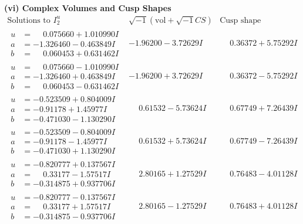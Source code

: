 \documentclass[1p]{elsarticle_modified}
\theoremstyle{definition}
\newcommand{\I}{\sqrt{-1}}
\begin{document}
\newpage\flushleft \textbf{(vi) Complex Volumes and Cusp Shapes}
$$\begin{array}{c|c|c}  
\text{Solutions to }I^u_{2}& \I (\text{vol} + \sqrt{-1}CS) & \text{Cusp shape}\\
 \hline 
\begin{aligned}
u &= \phantom{-}0.075660 + 1.010990 I \\
a &= -1.326460 - 0.463849 I \\
b &= \phantom{-}0.060453 + 0.631462 I\end{aligned}
 & -1.96200 - 3.72629 I & \phantom{-}0.36372 + 5.75292 I \\ \hline\begin{aligned}
u &= \phantom{-}0.075660 - 1.010990 I \\
a &= -1.326460 + 0.463849 I \\
b &= \phantom{-}0.060453 - 0.631462 I\end{aligned}
 & -1.96200 + 3.72629 I & \phantom{-}0.36372 - 5.75292 I \\ \hline\begin{aligned}
u &= -0.523509 + 0.804009 I \\
a &= -0.91178 + 1.45977 I \\
b &= -0.471030 - 1.130290 I\end{aligned}
 & \phantom{-}0.61532 - 5.73624 I & \phantom{-}0.67749 + 7.26439 I \\ \hline\begin{aligned}
u &= -0.523509 - 0.804009 I \\
a &= -0.91178 - 1.45977 I \\
b &= -0.471030 + 1.130290 I\end{aligned}
 & \phantom{-}0.61532 + 5.73624 I & \phantom{-}0.67749 - 7.26439 I \\ \hline\begin{aligned}
u &= -0.820777 + 0.137567 I \\
a &= \phantom{-}0.33177 - 1.57517 I \\
b &= -0.314875 + 0.937706 I\end{aligned}
 & \phantom{-}2.80165 + 1.27529 I & \phantom{-}0.76483 - 4.01128 I \\ \hline\begin{aligned}
u &= -0.820777 - 0.137567 I \\
a &= \phantom{-}0.33177 + 1.57517 I \\
b &= -0.314875 - 0.937706 I\end{aligned}
 & \phantom{-}2.80165 - 1.27529 I & \phantom{-}0.76483 + 4.01128 I \\ \hline\begin{aligned}

\end{aligned}
\end{array}$$
\end{document}

